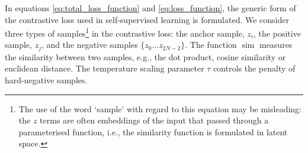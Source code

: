 In equations \ref{eq:total_loss_function} and \ref{eq:loss_function}, the generic form of the contrastive loss used in self-supervised learning is formulated. We consider three types of samples\footnote{The use of the word `sample' with regard to this equation may be misleading: the $z$ terms are often embeddings of the input that passed through a parameterised function, i.e., the similarity function is formulated in latent space.} in the contrastive loss: the anchor sample, $z_i$, the positive sample, $z_j$, and the negative samples $\{ z_0 \dots z_{2N-2} \}$. The function $\operatorname{sim}$ measures the similarity between two samples, e.g., the dot product, cosine similarity or euclidean distance. The temperature scaling parameter $\tau$ controls the penalty of hard-negative samples. 





